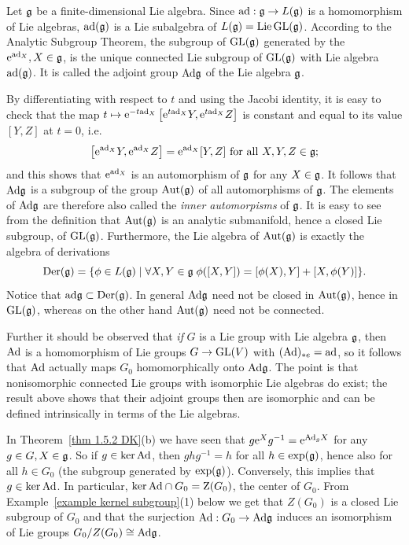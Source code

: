 \begin{example}\label{ex adjoint group}
    Let $\mathfrak{g}$ be a finite-dimensional Lie algebra. Since $\mathrm{ad}:\mathfrak{g}\to \boldsymbol{\mathrm{\mathrm}}{L}(\mathfrak{g})$ is a homomorphism of Lie algebras, $\mathrm{ad}(\mathfrak{g})$ is a Lie subalgebra of $\boldsymbol{\mathrm{\mathrm}}{L}(\mathfrak{g})=\operatorname{Lie}\operatorname{GL}(\mathfrak{g})$. According to the Analytic Subgroup Theorem, the subgroup of $\operatorname{GL}(\mathfrak{g})$ generated by the $\mathrm{e}^{\mathrm{ad}_X}, X\in\mathfrak{g}$, is the unique connected Lie subgroup of $\operatorname{GL}(\mathfrak{g})$ with Lie algebra $\mathrm{ad}(\mathfrak{g})$. It is called the adjoint group $\mathrm{Ad}\mathfrak{g}$ of the Lie algebra $\mathfrak{g}$.
    
    By differentiating with respect to $t$ and using the Jacobi identity, it is easy to check that the map $t\mapsto \mathrm{e}^{-t\mathrm{ad}_X}\left[\mathrm{e}^{t\mathrm{ad}_X}Y,\mathrm{e}^{t\mathrm{ad}_X}Z\right]$ is constant and equal to its value $[Y,Z]$ at $t=0$, i.e.
    \[\left[\mathrm{e}^{\mathrm{ad}_X}Y,\mathrm{e}^{\mathrm{ad}_X}Z\right]=\mathrm{e}^{\mathrm{ad}_X}[Y,Z] \text{ for all }X,Y,Z\in\mathfrak{g};\]
    and this shows that $\mathrm{e}^{\mathrm{ad}_X}$ is an automorphism of $\mathfrak{g}$ for any $X\in\mathfrak{g}$. It follows that $\mathrm{Ad}\mathfrak{g}$ is a subgroup of the group $\operatorname{Aut}(\mathfrak{g})$ of all automorphisms of $\mathfrak{g}$. The elements of $\mathrm{Ad}\mathfrak{g}$ are therefore also called the \emph{inner automorpisms} of $\mathfrak{g}$. It is easy to see from the definition that $\operatorname{Aut}(\mathfrak{g})$ is an analytic submanifold, hence a closed Lie subgroup, of $\operatorname{GL}(\mathfrak{g})$. Furthermore, the Lie algebra of $\operatorname{Aut}(\mathfrak{g})$ is exactly the algebra of derivations
    \[\operatorname{Der}(\mathfrak{g})=\{\phi\in \boldsymbol{\mathrm{\mathrm}}{L}(\mathfrak{g})\mid \forall X,Y\in\mathfrak{g}\;\phi ([X,Y])=[\phi(X),Y]+[X,\phi(Y)]\}.\]
    Notice that $\mathrm{ad}\mathfrak{g}\subset \operatorname{Der}(\mathfrak{g})$. In general $\mathrm{Ad}\mathfrak{g}$ need not be closed in $\operatorname{Aut}(\mathfrak{g})$, hence in $\operatorname{GL}(\mathfrak{g})$, whereas on the other hand $\operatorname{Aut}(\mathfrak{g})$ need not be connected.

    Further it should be observed that \emph{if} $G$ is a Lie group with Lie algebra $\mathfrak{g}$, then $\mathrm{Ad}$ is a homomorphism of Lie groups $G\to\operatorname{GL}(V)$ with $(\mathrm{Ad})_{\ast e}=\mathrm{ad}$, so it follows that $\mathrm{Ad}$ actually maps $G_0$ homomorphically onto $\mathrm{Ad}\mathfrak{g}$. The point is that nonisomorphic connected Lie groups with isomorphic Lie algebras do exist; the result above shows that their adjoint groups then are isomorphic and can be defined intrinsically in terms of the Lie algebras.

    In Theorem~\ref{thm 1.5.2 DK}(b) we have seen that $g\mathrm{e}^X g^{-1}=\mathrm{e}^{\mathrm{Ad}_g X}$ for any $g\in G,X\in\mathfrak{g}$. So if $g\in\ker \mathrm{Ad}$, then $ghg^{-1}=h$ for all $h\in \exp(\mathfrak{g})$, hence also for all $h\in G_0$ (the subgroup generated by $\exp(\mathfrak{g})$). Conversely, this implies that $g\in\ker \mathrm{Ad}$. In particular, $\ker\mathrm{Ad}\cap G_0=\mathrm{Z}(G_0)$, the center of $G_0$. From Example~\ref{example kernel subgroup}(1) below we get that $Z(G_0)$ is a closed Lie subgroup of $G_0$ and that the surjection $\mathrm{Ad}:G_0\to \mathrm{Ad}\mathfrak{g}$ induces an isomorphism of Lie groups $G_0\slash Z(G_0)\cong \mathrm{Ad}\mathfrak{g}$.
\end{example}




